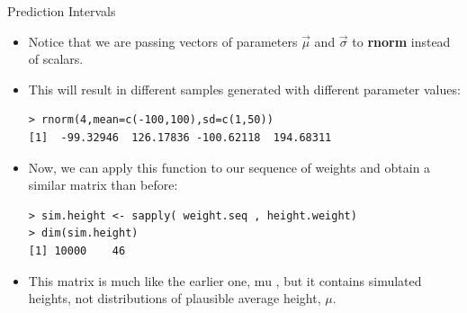 \documentclass[handout]{beamer}
\begin{document}
\begin{frame}[fragile]{Prediction Intervals}
\scriptsize{
\begin{itemize}


\item Notice that we are passing  vectors of parameters $\vec{\mu}$ and $\vec{\sigma}$ to \textbf{rnorm} instead of scalars.

\item This will result in different samples generated with different parameter values:

\begin{verbatim}
> rnorm(4,mean=c(-100,100),sd=c(1,50))
[1]  -99.32946  126.17836 -100.62118  194.68311
\end{verbatim}

\item Now, we can apply this function to our sequence of weights and obtain a similar matrix  than before:

\begin{verbatim}
> sim.height <- sapply( weight.seq , height.weight)
> dim(sim.height)
[1] 10000    46 
\end{verbatim}

\item This matrix is much like the earlier one, mu , but it contains simulated heights, not distributions of plausible average height, $\mu$.


\end{itemize}
 

 
}
\end{frame}
\end{document}
